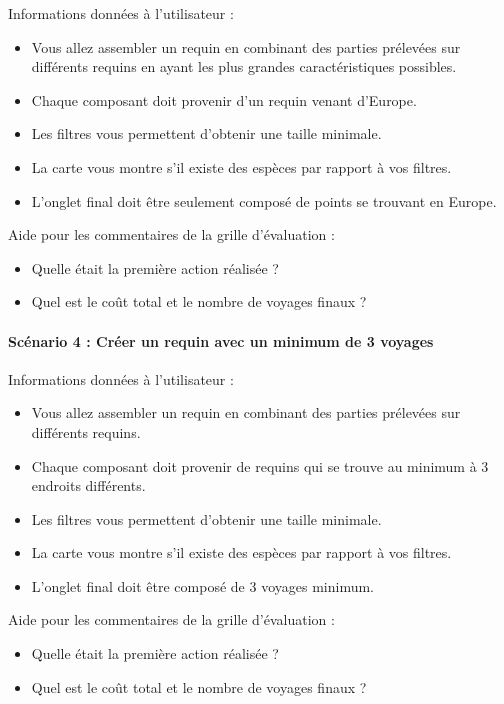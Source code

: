 \documentclass{article}
\begin{document}
Informations données à l'utilisateur :
\begin{itemize}
	\item Vous allez assembler un requin en combinant des parties prélevées sur différents requins en ayant les plus grandes caractéristiques possibles.
	\item Chaque composant doit provenir d'un requin venant d'Europe.
	\item Les filtres vous permettent d'obtenir une taille minimale.
	\item La carte vous montre s'il existe des espèces par rapport à vos filtres.
	\item L'onglet final doit être seulement composé de points se trouvant en Europe.
\end{itemize}

Aide pour les commentaires de la grille d'évaluation :
\begin{itemize}
	\item Quelle était la première action réalisée ?
	\item Quel est le coût total et le nombre de voyages finaux ?
\end{itemize}

\paragraph{Scénario 4 : Créer un requin avec un minimum de 3 voyages}

Informations données à l'utilisateur :
\begin{itemize}
	\item Vous allez assembler un requin en combinant des parties prélevées sur différents requins.
	\item Chaque composant doit provenir de requins qui se trouve au minimum à 3 endroits différents.
	\item Les filtres vous permettent d'obtenir une taille minimale.
	\item La carte vous montre s'il existe des espèces par rapport à vos filtres.
	\item L'onglet final doit être composé de 3 voyages minimum.
\end{itemize}

Aide pour les commentaires de la grille d'évaluation :
\begin{itemize}
	\item Quelle était la première action réalisée ?
	\item Quel est le coût total et le nombre de voyages finaux ?
\end{itemize}
\end{document}
